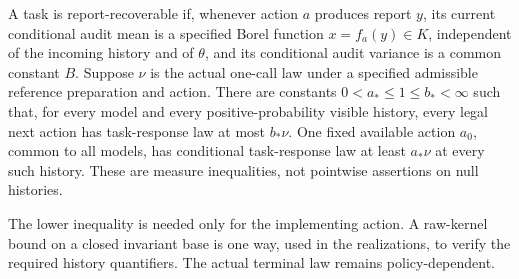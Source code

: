 \begin{definition}\label{def:recoverable}
A task is report-recoverable if, whenever action $a$ produces report $y$, its current conditional audit mean is a specified Borel function $x=f_a(y)\in K$, independent of the incoming history and of $\theta$, and its conditional audit variance is a common constant $B$. Suppose $\nu$ is the actual one-call law under a specified admissible reference preparation and action. There are constants $0<a_*\le1\le b_*<\infty$ such that, for every model and every positive-probability visible history, every legal next action has task-response law at most $b_*\nu$. One fixed available action $a_0$, common to all models, has conditional task-response law at least $a_*\nu$ at every such history. These are measure inequalities, not pointwise assertions on null histories.
\end{definition}
The lower inequality is needed only for the implementing action. A raw-kernel bound on a closed invariant base is one way, used in the realizations, to verify the required history quantifiers. The actual terminal law remains policy-dependent.


